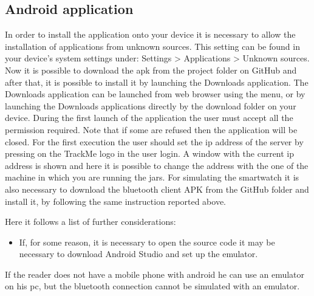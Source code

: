 \subsection{Android application}
In order to install the application onto your device it is necessary to allow the installation of applications from unknown sources. This setting can be found in your device's system settings under: Settings > Applications > Unknown sources. 
\\
Now it is possible to download the apk from the project folder on GitHub and after that, it is possible to install it by launching the Downloads application. The Downloads application can be launched from web browser using the menu, or by launching the Downloads applications directly by the download folder on your device. During the first launch of the application the user must accept all the permission required. Note that if some are refused then the application will be closed. For the first execution the user should set the ip address of the server by pressing on the TrackMe logo in the user login. A window with the current ip address is shown and here it is possible to change the address with the one of the machine in which you are running the jars. 
For simulating the smartwatch it is also necessary to download the bluetooth client APK from the GitHub folder and install it, by following the same instruction reported above.

\par 
Here it follows a list of further considerations: 
\begin{itemize}
\item If, for some reason, it is necessary to open the source code it may be necessary to download Android Studio and set up the emulator. \\
\end{itemize}

\par
If the reader does not have a mobile phone with android he can use an emulator on his pc, but the bluetooth connection cannot be simulated with an emulator.

